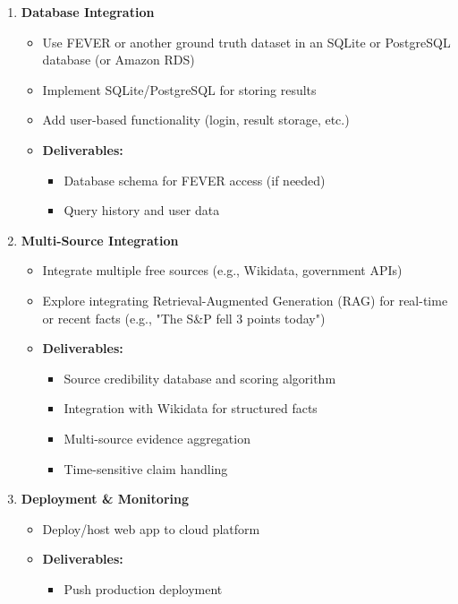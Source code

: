 \documentclass[11pt,letterpaper]{article}
\begin{document}
{\begin{enumerate}[label=\textbf{Week \arabic*:}]
    \item \textbf{Database Integration}
    \begin{itemize}[label=$\bullet$]
        \item Use FEVER or another ground truth dataset in an SQLite or PostgreSQL database (or Amazon RDS)
        \item Implement SQLite/PostgreSQL for storing results
        \item Add user-based functionality (login, result storage, etc.)
        \item \textbf{Deliverables:}
        \begin{itemize}[label=$\square$]
            \item Database schema for FEVER access (if needed)
            \item Query history and user data
        \end{itemize}
    \end{itemize} 

    \item \textbf{Multi-Source Integration}
    \begin{itemize}[label=$\bullet$]
        \item Integrate multiple free sources (e.g., Wikidata, government APIs)
        \item Explore integrating Retrieval-Augmented Generation (RAG) for real-time or recent facts (e.g., "The S\&P fell 3 points today")
        \item \textbf{Deliverables:}
        \begin{itemize}[label=$\square$]
            \item Source credibility database and scoring algorithm
            \item Integration with Wikidata for structured facts
            \item Multi-source evidence aggregation
            \item Time-sensitive claim handling
        \end{itemize}
    \end{itemize}

    \item \textbf{Deployment \& Monitoring}
    \begin{itemize}[label=$\bullet$]
    \item Deploy/host web app to cloud platform
    \item \textbf{Deliverables:}
        \begin{itemize}[label=$\square$]
            \item Push production deployment
        \end{itemize}
    \end{itemize}


\end{enumerate}}
\end{document}
